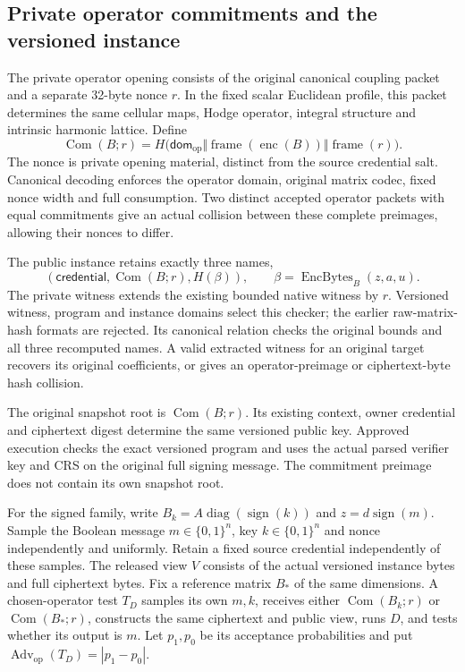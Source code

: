 \subsection{Private operator commitments and the versioned instance}
\label{sec:private-operator-instance}

The private operator opening consists of the original canonical coupling
packet and a separate 32-byte nonce \(r\). In the fixed scalar Euclidean
profile, this packet determines the same cellular maps, Hodge operator,
integral structure and intrinsic harmonic lattice. Define
\[
 \operatorname{Com}(B;r)=
 H\bigl(\mathsf{dom}_{\mathrm{op}}\Vert
   \operatorname{frame}(\operatorname{enc}(B))\Vert
   \operatorname{frame}(r)\bigr).
\]
The nonce is private opening material, distinct from the source credential
salt. Canonical decoding enforces the operator domain, original matrix codec,
fixed nonce width and full consumption. Two distinct accepted operator
packets with equal commitments give an actual collision between these
complete preimages, allowing their nonces to differ.

The public instance retains exactly three names,
\[
 (\mathsf{credential},\operatorname{Com}(B;r),H(\beta)),
 \qquad \beta=\operatorname{EncBytes}_B(z,a,u).
\]
The private witness extends the existing bounded native witness by \(r\).
Versioned witness, program and instance domains select this checker; the
earlier raw-matrix-hash formats are rejected. Its canonical relation checks
the original bounds and all three recomputed names. A valid extracted
witness for an original target recovers its original coefficients, or gives
an operator-preimage or ciphertext-byte hash collision.

The original snapshot root is \(\operatorname{Com}(B;r)\). Its existing
context, owner credential and ciphertext digest determine the same versioned
public key. Approved execution checks the exact versioned program and uses
the actual parsed verifier key and CRS on the original full signing message.
The commitment preimage does not contain its own snapshot root.

For the signed family, write
\(B_k=A\operatorname{diag}(\operatorname{sign}(k))\) and
\(z=d\operatorname{sign}(m)\). Sample the Boolean message
\(m\in\{0,1\}^n\), key \(k\in\{0,1\}^n\) and nonce independently and uniformly. Retain a
fixed source credential independently of these samples. The released view
\(V\) consists of the actual versioned instance bytes and full ciphertext
bytes. Fix a reference matrix \(B_*\) of the same dimensions. A
chosen-operator test \(T_D\) samples its own \(m,k\), receives either
\(\operatorname{Com}(B_k;r)\) or \(\operatorname{Com}(B_*;r)\), constructs
the same ciphertext and public view, runs \(D\), and tests whether its output
is \(m\). Let \(p_1,p_0\) be its acceptance probabilities and put
\(\operatorname{Adv}_{\mathrm{op}}(T_D)=|p_1-p_0|\).


